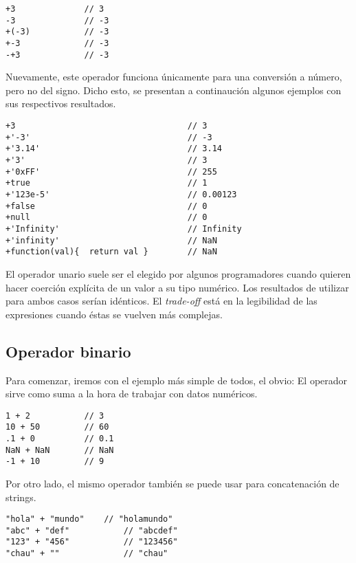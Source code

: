 \begin{lstlisting}[title={Operador unario \code{+}}]
+3				// 3
-3				// -3
+(-3)			// -3
+-3				// -3
-+3				// -3
\end{lstlisting}

Nuevamente, este operador funciona únicamente para una conversión a número, pero no del signo. Dicho esto, se presentan a continaución algunos ejemplos con sus respectivos resultados.

\begin{lstlisting}[title={Operador unario \code{+} (más casos)}]
+3                                   // 3
+'-3'                                // -3
+'3.14'                              // 3.14
+'3'                                 // 3
+'0xFF'                              // 255
+true                                // 1
+'123e-5'                            // 0.00123
+false                               // 0
+null                                // 0
+'Infinity'                          // Infinity
+'infinity'                          // NaN
+function(val){  return val }        // NaN
\end{lstlisting}

El operador unario \code{+} suele ser el elegido por algunos programadores cuando quieren hacer coerción explícita de un valor a su tipo numérico. Los resultados de utilizar  para ambos casos serían idénticos. El \textit{trade-off} está en la legibilidad de las expresiones cuando éstas se vuelven más complejas.

\subsection{Operador binario}

Para comenzar, iremos con el ejemplo más simple de todos, el obvio: El operador \code{+} sirve como suma a la hora de trabajar con datos numéricos.

\begin{lstlisting}[title={Operador \code{+} en números}]
1 + 2 			// 3
10 + 50 		// 60
.1 + 0			// 0.1
NaN + NaN		// NaN
-1 + 10			// 9
\end{lstlisting}

Por otro lado, el mismo operador también se puede usar para concatenación de strings.

\begin{lstlisting}[title={Operador \code{+} en strings}]
"hola" + "mundo"	// "holamundo"
"abc" + "def"			// "abcdef"
"123" + "456"			// "123456"
"chau" + ""				// "chau"
\end{lstlisting}

